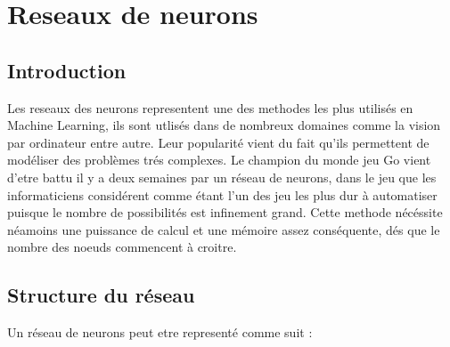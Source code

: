 \section{Reseaux de neurons}

\subsection{Introduction}

Les reseaux des neurons representent une des methodes les plus utilisés en Machine Learning, ils sont utlisés dans de nombreux domaines comme la vision par ordinateur entre autre. Leur popularité vient du fait qu'ils permettent de modéliser des problèmes trés complexes. Le champion du monde jeu Go vient d'etre battu il y a deux semaines par un réseau de neurons, dans le jeu que les informaticiens considérent comme étant l'un des jeu les plus dur à automatiser puisque le nombre de possibilités est infinement grand.
Cette methode nécéssite néamoins une puissance de calcul et une mémoire assez conséquente, dés que le nombre des noeuds commencent à croitre.

\subsection{Structure du réseau}

Un réseau de neurons peut etre representé comme suit :

\def\layersep{2.5cm}


